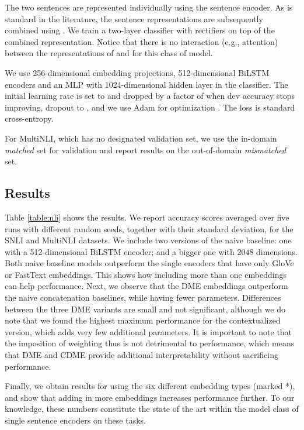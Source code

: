 \documentclass[11pt,a4paper]{article}
\begin{document}
The two sentences are represented individually using the sentence encoder. As is standard in the literature, the sentence representations are subsequently combined using . We train a two-layer classifier with rectifiers on top of the combined representation. Notice that there is no interaction (e.g., attention) between the representations of  and  for this class of model.

We use 256-dimensional embedding projections,  512-dimensional BiLSTM encoders and an MLP with 1024-dimensional hidden layer in the classifier. The initial learning rate is set to  and dropped by a factor of  when dev accuracy stops improving, dropout to , and we use Adam for optimization \cite{Kingma:2014arxiv}. The loss is standard cross-entropy.

For MultiNLI, which has no designated validation set, we use the in-domain \emph{matched} set for validation and report results on the out-of-domain \emph{mismatched} set.

\subsection{Results}

Table \ref{table:nli} shows the results. We report accuracy scores averaged over five runs with different random seeds, together with their standard deviation, for the SNLI and MultiNLI datasets. We include two versions of the naive baseline: one with a 512-dimensional BiLSTM encoder; and a bigger one with 2048 dimensions. Both naive baseline models outperform the single encoders that have only GloVe or FastText embeddings. This shows how including more than one embeddings can help performance. Next, we observe that the DME embeddings outperform the naive concatenation baselines, while having fewer parameters. Differences between the three DME variants are small and not significant, although we do note that we found the highest maximum performance for the contextualized version, which adds very few additional parameters. It is important to note that the imposition of weighting thus is not detrimental to performance, which means that DME and CDME provide additional interpretability without sacrificing performance.

Finally, we obtain results for using the six different embedding types (marked *), and show that adding in more embeddings increases performance further. To our knowledge, these numbers constitute the state of the art within the model class of single sentence encoders on these tasks.
\end{document}

